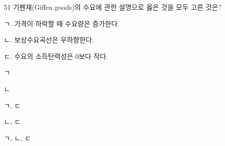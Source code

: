 \begin{question}{51}
기펜재(Giffen goods)의 수요에 관한 설명으로 옳은 것을 모두 고른 것은?
\begin{framedtext}
ㄱ. 가격이 하락할 때 수요량은 증가한다. \par
ㄴ. 보상수요곡선은 우하향한다. \par
ㄷ. 수요의 소득탄력성은 0보다 작다. \par
\end{framedtext}
\begin{choices}
  \item ㄱ
  \item ㄴ
  \item ㄱ, ㄷ
  \item ㄴ, ㄷ
  \item ㄱ, ㄴ, ㄷ
\end{choices}
\end{question}
